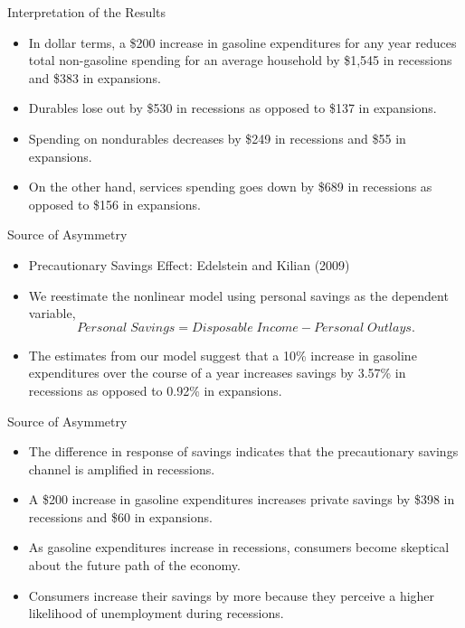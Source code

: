 \documentclass[
  10pt,
  ignorenonframetext,
]{beamer}
\begin{document}
\begin{frame}{Interpretation of the Results}
\protect\hypertarget{interpretation-of-the-results-1}{}

\begin{itemize}
\item
  In dollar terms, a \$200 increase in gasoline expenditures for any
  year reduces total non-gasoline spending for an average household by
  \$1,545 in recessions and \$383 in expansions.
\item
  Durables lose out by \$530 in recessions as opposed to \$137 in
  expansions.
\item
  Spending on nondurables decreases by \$249 in recessions and \$55 in
  expansions.
\item
  On the other hand, services spending goes down by \$689 in recessions
  as opposed to \$156 in expansions.
\end{itemize}

\end{frame}

\begin{frame}{Source of Asymmetry}
\protect\hypertarget{source-of-asymmetry}{}

\begin{itemize}
\item
  Precautionary Savings Effect: Edelstein and Kilian (2009)
\item
  We reestimate the nonlinear model using personal savings as the
  dependent variable,
  \[Personal\;Savings=Disposable\;Income-Personal\;Outlays. \]
\item
  The estimates from our model suggest that a 10\% increase in gasoline
  expenditures over the course of a year increases savings by 3.57\% in
  recessions as opposed to 0.92\% in expansions.
\end{itemize}

\end{frame}

\begin{frame}{Source of Asymmetry}
\protect\hypertarget{source-of-asymmetry-1}{}

\begin{itemize}
\item
  The difference in response of savings indicates that the precautionary
  savings channel is amplified in recessions.
\item
  A \$200 increase in gasoline expenditures increases private savings by
  \$398 in recessions and \$60 in expansions.
\item
  As gasoline expenditures increase in recessions, consumers become
  skeptical about the future path of the economy.
\item
  Consumers increase their savings by more because they perceive a
  higher likelihood of unemployment during recessions.
\end{itemize}

\end{frame}
\end{document}
